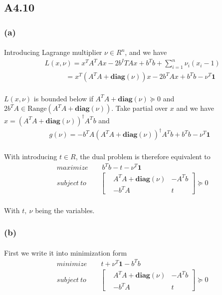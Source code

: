 \subsection*{A4.10}
\subsubsection*{(a)}
\paragraph{}
Introducing Lagrange multiplier $\nu \in R^n$, and we have
\begin{align*}
&L(x, \nu) = x^TA^TAx -2b^ITAx +b^Tb +\sum_{i=1}^{n}\nu_i(x_i-1) \\
& \qquad \quad = x^T(A^TA +\textbf{diag}(\nu))x-2b^TAx +b^Tb -\nu^T\textbf{1}
\end{align*}
\paragraph{}
$L(x,\nu)$ is bounded below if $A^TA+\textbf{diag}(\nu) \succeq 0$ and $2b^TA \in \text{Range}(A^TA+\textbf{diag}(\nu))$. Take partial over $x$ and we have $x =(A^TA+\textbf{diag}(\nu))^\dagger A^Tb$ and 
\begin{align*}
g(\nu) =-b^TA(A^TA+\textbf{diag}(\nu))^\dagger A^Tb +b^Tb-\nu^T\textbf{1}
\end{align*}
\paragraph{}
With introducing $t\in R$, the dual problem is therefore equivalent to 
\begin{align*}
&maximize \qquad b^Tb-t-\nu^T\textbf{1}\\
&subject\ to \qquad \begin{bmatrix}
&A^TA+\textbf{diag}(\nu)&-A^Tb\\&-b^TA&t
\end{bmatrix} \succeq 0
\end{align*}
\paragraph{}
With $t,\ \nu$ being the variables.
\subsubsection*{(b)}
\paragraph{}
First we write it into minimization form
\begin{align*}
&minimize \qquad t+\nu^T\textbf{1}-b^Tb\\
&subject\ to \qquad \begin{bmatrix}
&A^TA+\textbf{diag}(\nu)&-A^Tb\\&-b^TA&t
\end{bmatrix} \succeq 0
\end{align*}
